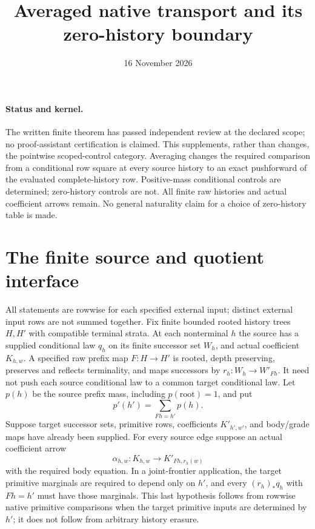 \documentclass[11pt]{article}
\title{Averaged native transport and its zero-history boundary}
\date{16 November 2026}
\begin{document}
\maketitle
\paragraph{Status and kernel.} The written finite theorem has passed independent review at the declared scope; no proof-assistant certification is claimed. This supplements, rather than changes, the pointwise scoped-control category. Averaging changes the required comparison from a conditional row square at every source history to an exact pushforward of the evaluated complete-history row. Positive-mass conditional controls are determined; zero-history controls are not. All finite raw histories and actual coefficient arrows remain. No general naturality claim for a choice of zero-history table is made.

\section{The finite source and quotient interface}
All statements are rowwise for each specified external input; distinct external input rows are not summed together. Fix finite bounded rooted history trees $H,H'$ with compatible terminal strata. At each nonterminal $h$ the source has a supplied conditional law $q_h$ on its finite successor set $W_h$, and actual coefficient $K_{h,w}$. A specified raw prefix map $F:H\to H'$ is rooted, depth preserving, preserves and reflects terminality, and maps successors by $r_h:W_h\to W'_{Fh}$. It need not push each source conditional law to a common target conditional law. Let $p(h)$ be the source prefix mass, including $p(\mathrm{root})=1$, and put
\[
 p'(h')=\sum_{Fh=h'}p(h).
\]
Suppose target successor sets, primitive rows, coefficients $K'_{h',w'}$, and body/grade maps have already been supplied. For every source edge suppose an actual coefficient arrow
\[
 \alpha_{h,w}:K_{h,w}\to K'_{Fh,r_h(w)}
\]
with the required body equation. In a joint-frontier application, the target primitive marginals are required to depend only on $h'$, and every $(r_h)_*q_h$ with $Fh=h'$ must have those marginals. This last hypothesis follows from rowwise native primitive comparisons when the target primitive inputs are determined by $h'$; it does not follow from arbitrary history erasure.
\end{document}
